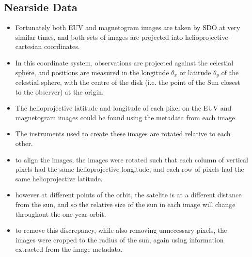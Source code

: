 \documentclass[11pt,a4paper,onecolumn]{report}
\begin{document}
\subsection{Nearside Data}
\begin{itemize}
  \item Fortunately both EUV and magnetogram images are taken by SDO at very similar
  times, and both sets of images are projected into helioprojective-cartesian
  coordinates.
  \item In this coordinate system, observations are projected against the
  celestial sphere, and positions are measured in the longitude \(\theta_x\) or
  latitude \(\theta_y\) of the celestial sphere, with the centre of the disk
  (i.e. the point of the Sun closest to the observer) at the origin.
  \item The helioprojective latitude and longitude of each pixel on the EUV and
  magnetogram images could be found using the metadata from each image.
  \item The instruments used to create these images are rotated relative to each
  other.
  \item to align the images, the images were rotated such that each column of
  vertical pixels had the same helioprojective longitude, and each row of pixels
  had the same helioprojective latitude.
  \item however at different points of the orbit, the satelite is at a different
  distance from the sun, and so the relative size of the sun in each image will
  change throughout the one-year orbit.
  \item to remove this discrepancy, while also removing unnecessary pixels, the
  images were cropped to the radius of the sun, again using information
  extracted from the image metadata.
\end{itemize}
\end{document}
